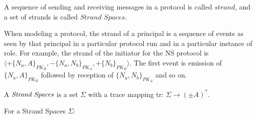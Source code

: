 A sequence of sending and receiving messages in a protocol is called $strand$, and a set of strands is called $\textit{Strand Spaces}$. 

When modeling a protocol, the strand of a principal is a sequence of events as seen by that principal in a particular protocol run and in a particular instance of role. For example, the strand of the initiator for the NS protocol is $\langle+\{N_a,A\}_{PK_B}, -\{N_a,N_b\}_{PK_A},+\{N_b\}_{PK_B} \rangle$. The first event is emission of $\{N_a,A\}_{PK_B}$ followed by reception of $\{N_a,N_b\}_{PK_A}$ and so on. 

\begin{Definition}
A $\emph{Strand Spaces}$ is a set $\Sigma$ with a trace mapping tr: $\Sigma \rightarrow (\pm A)^*$.
\end{Definition}

For a Strand Spaces $\Sigma$:

